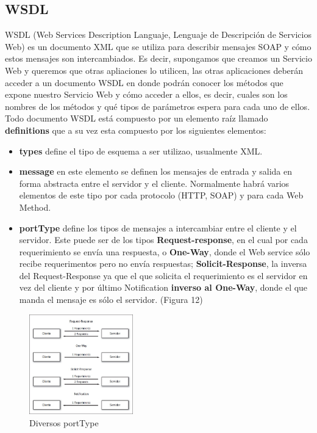\documentclass[12pt,letterpaper,titlepage]{article}
\begin{document}

\subsection{WSDL}\label{wsdl}
WSDL (Web Services Description Languaje, Lenguaje de Descripción de Servicios Web) es un documento XML que se utiliza para describir mensajes SOAP y cómo estos mensajes son intercambiados. Es decir, supongamos que creamos un Servicio Web y queremos que otras apliaciones lo utilicen, las otras aplicaciones deberán acceder a un documento WSDL en donde podrán conocer los métodos que expone nuestro Servicio Web y cómo acceder a ellos, es decir, cuales son los nombres de los métodos y qué tipos de parámetros espera para cada uno de ellos. Todo documento WSDL está compuesto por un elemento raíz llamado \textbf{definitions} que a su vez esta compuesto por los siguientes elementos:\\

\begin{itemize}\itemsep=0pt
\item \textbf{types} define el tipo de esquema a ser utilizao, usualmente XML.
\item \textbf{message} en este elemento se definen los mensajes de entrada y salida en forma abstracta entre el servidor y el cliente. Normalmente habrá varios elementos de este tipo por cada protocolo (HTTP, SOAP) y para cada Web Method.
\item \textbf{portType} define los tipos de mensajes a intercambiar entre el cliente y el servidor. Este puede ser de los tipos \textbf{Request-response}, en el cual por cada requerimiento se envía una respuesta, o \textbf{One-Way}, donde el Web service sólo recibe requerimentos pero no envía  respuestas; \textbf{Solicit-Response}, la inversa del Request-Response ya que el que solicita el requerimiento es el servidor en vez del cliente y por último Notification \textbf{inverso al One-Way}, donde el que manda el mensaje es sólo el servidor. (Figura 12)
\end{itemize}

\begin{figure}
  \centering
    \includegraphics[width=0.4\textwidth]{12_porttype}
  \caption{Diversos portType}
  \label{figx:porttype}
\end{figure}
\end{document}
